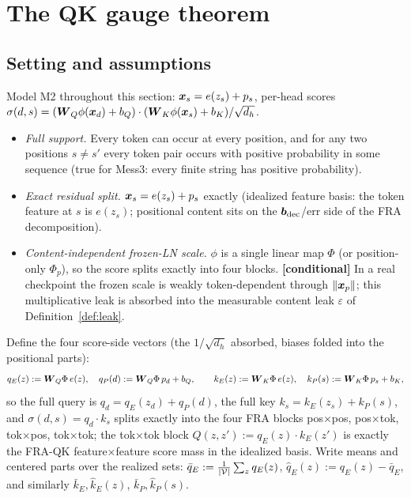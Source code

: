 \documentclass{article}
\begin{document}
\section{The QK gauge theorem}\label{sec:qk}

\subsection{Setting and assumptions}

Model M2 throughout this section: $\boldsymbol{x}_s = e(z_s) + p_s$, per-head scores $\sigma(d,s) = (\boldsymbol{W}_Q\phi(\boldsymbol{x}_d) + b_Q)\cdot(\boldsymbol{W}_K\phi(\boldsymbol{x}_s) + b_K)/\sqrt{d_h}$.

\begin{assumption}\label{ass:qk}
\begin{itemize}
    \item[\textbf{(A0)}] \emph{Full support.} Every token can occur at every position, and for any two positions $s \ne s'$ every token pair occurs with positive probability in some sequence (true for Mess3: every finite string has positive probability).
    \item[\textbf{(A1)}] \emph{Exact residual split.} $\boldsymbol{x}_s = e(z_s) + p_s$ exactly (idealized feature basis: the token feature at $s$ is $e(z_s)$; positional content sits on the $\boldsymbol{b}_{\mathrm{dec}}$/err side of the FRA decomposition).
    \item[\textbf{(A2)}] \emph{Content-independent frozen-LN scale.} $\phi$ is a single linear map $\Phi$ (or position-only $\Phi_p$), so the score splits exactly into four blocks. \textbf{[conditional]} In a real checkpoint the frozen scale is weakly token-dependent through $\|\boldsymbol{x}_p\|$; this multiplicative leak is absorbed into the measurable content leak $\varepsilon$ of Definition~\ref{def:leak}.
\end{itemize}
\end{assumption}

Define the four score-side vectors (the $1/\sqrt{d_h}$ absorbed, biases folded into the positional parts):
\begin{equation}
    q_E(z) := \boldsymbol{W}_Q\Phi\, e(z), \quad q_P(d) := \boldsymbol{W}_Q\Phi\, p_d + b_Q, \qquad
    k_E(z) := \boldsymbol{W}_K\Phi\, e(z), \quad k_P(s) := \boldsymbol{W}_K\Phi\, p_s + b_K,
\end{equation}
so the full query is $q_d = q_E(z_d) + q_P(d)$, the full key $k_s = k_E(z_s) + k_P(s)$, and $\sigma(d,s) = q_d \cdot k_s$ splits exactly into the four FRA blocks pos$\times$pos, pos$\times$tok, tok$\times$pos, tok$\times$tok; the tok$\times$tok block $Q(z, z') := q_E(z)\cdot k_E(z')$ is exactly the FRA-QK feature$\times$feature score mass in the idealized basis. Write means and centered parts over the realized sets: $\bar q_E := \tfrac1{{\vert \mathcal{V}\vert}}\sum_z q_E(z)$, $\hat q_E(z) := q_E(z) - \bar q_E$, and similarly $\bar k_E, \hat k_E(z)$, $\bar k_P, \hat k_P(s)$.
\end{document}
